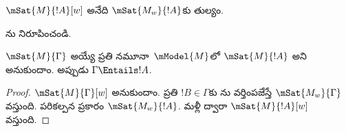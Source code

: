 \documentclass[../../../include/open-logic-section]{subfiles}
\begin{document}
\begin{prop}
  $\mSat{M}{!A}[w]$ అనేది $\mSat{M_w}{!A}$కు తుల్యం.
\end{prop}

\begin{prob}
  ను నిరూపించండి.
\end{prob}

\begin{prop}
  $\mSat{M}{\Gamma}$ అయ్యే ప్రతి నమూనా~$\mModel{M}$లో
  $\mSat{M}{!A}$ అని అనుకుందాం. అప్పుడు
  $\Gamma \Entails !A$.
\end{prop}

\begin{proof}
  $\mSat{M}{\Gamma}[w]$ అనుకుందాం. ప్రతి
  $!B \in \Gamma$కు ను
  వర్తింపజేస్తే $\mSat{M_w}{\Gamma}$ వస్తుంది.
  పరికల్పన ప్రకారం $\mSat{M_w}{!A}$.
  మళ్లీ  ద్వారా
  $\mSat{M}{!A}[w]$ వస్తుంది.
\end{proof}
\end{document}
